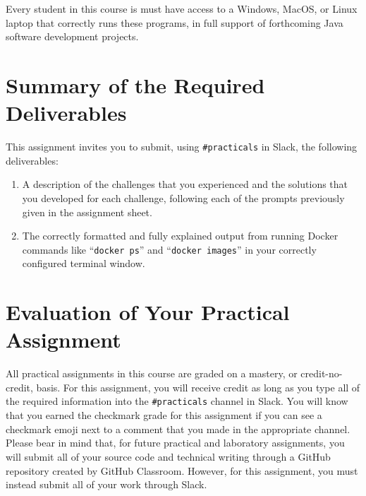 \documentclass[11pt]{article}
\newcommand{\command}[1]{``\lstinline{#1}''}
\newcommand{\url}[1]{\lstinline{#1}}
\begin{document}
Every student in this course is must have access to a Windows, MacOS, or Linux
laptop that correctly runs these programs, in full support of forthcoming Java
software development projects.

\section*{Summary of the Required Deliverables}


\noindent This assignment invites you to submit, using \url{#practicals} in
Slack, the following deliverables:

\vspace*{-.025in}

\begin{enumerate}

  \setlength{\itemsep}{0in}

  \item A description of the challenges that you experienced and the solutions
    that you developed for each challenge, following each of the prompts
    previously given in the assignment sheet.

  \item The correctly formatted and fully explained output from running Docker
    commands like \command{docker ps} and \command{docker images} in your
    correctly configured terminal window.

\end{enumerate}

\vspace*{-.075in}

\section*{Evaluation of Your Practical Assignment}

All practical assignments in this course are graded on a mastery, or
credit-no-credit, basis. For this assignment, you will receive credit as long as
you type all of the required information into the \url{#practicals} channel in
Slack. You will know that you earned the checkmark grade for this assignment if
you can see a checkmark emoji next to a comment that you made in the appropriate
channel. Please bear in mind that, for future practical and laboratory
assignments, you will submit all of your source code and technical writing
through a GitHub repository created by GitHub Classroom. However, for this
assignment, you must instead submit all of your work through Slack.
\end{document}
